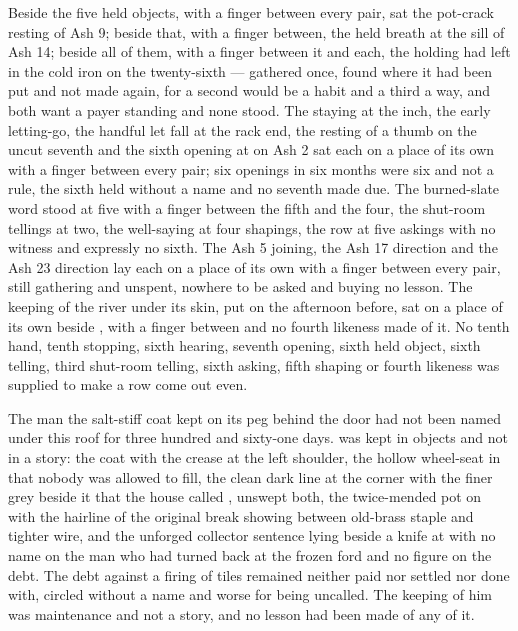 Beside the five held objects, with a finger between every pair, sat the pot-crack resting of Ash 9; beside that, with a finger between, the held breath at the sill of Ash 14; beside all of them, with a finger between it and each, the holding  had left in the cold iron on the twenty-sixth --- gathered once, found where it had been put and not made again, for a second would be a habit and a third a way, and both want a payer standing and none stood. The staying at the inch, the early letting-go, the handful let fall at the rack end, the resting of a thumb on the uncut seventh and the sixth opening at  on Ash 2 sat each on a place of its own with a finger between every pair; six openings in six months were six and not a rule, the sixth held without a name and no seventh made due. The burned-slate word stood at five with a finger between the fifth and the four, the shut-room tellings at two, the well-saying at four shapings, the row at five askings with no witness and expressly no sixth. The Ash 5 joining, the Ash 17 direction and the Ash 23 direction lay each on a place of its own with a finger between every pair, still gathering and unspent, nowhere to be asked and buying no lesson. The keeping of the river under its skin, put on the afternoon before, sat on a place of its own beside , with a finger between and no fourth likeness made of it. No tenth hand, tenth stopping, sixth hearing, seventh opening, sixth held object, sixth telling, third shut-room telling, sixth asking, fifth shaping or fourth likeness was supplied to make a row come out even.

The man the salt-stiff coat kept on its peg behind the door had not been named under this roof for three hundred and sixty-one days.  was kept in objects and not in a story: the coat with the crease at the left shoulder, the hollow wheel-seat in  that nobody was allowed to fill, the clean dark line at the corner with the finer grey beside it that the house called , unswept both, the twice-mended pot on  with the hairline of the original break showing between old-brass staple and tighter wire, and the unforged collector sentence lying beside a knife at  with no name on the man who had turned back at the frozen ford and no figure on the debt. The debt against a firing of tiles remained neither paid nor settled nor done with, circled without a name and worse for being uncalled. The keeping of him was maintenance and not a story, and no lesson had been made of any of it.

